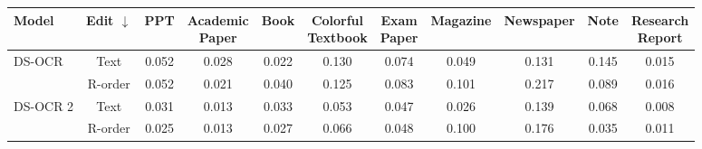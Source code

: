 \documentclass[11pt, a4paper, logo, copyright, nonumbering]{deepseek}
\begin{document}
\begin{CJK*}{UTF8}{gbsn}
\begin{table}[ht]
{        
        \begin{tabular}{l|c|ccccccccc}
                \toprule
            Model & Edit $\downarrow$ & PPT & \makecell{Academic \\ Paper} & Book & \makecell{Colorful \\ Textbook} & \makecell{Exam \\ Paper} & Magazine & Newspaper & Note & \makecell{Research \\ Report}  \\
                \midrule
                \multirow{2}{*}{DS-OCR} & Text & 0.052 & 0.028 & 0.022 & 0.130 & 0.074 & 0.049 & 0.131 & 0.145 & 0.015   \\
                  & R-order & 0.052 & 0.021 & 0.040 & 0.125 & 0.083 & 0.101 & 0.217 & 0.089 & 0.016   \\
                \midrule
                 \multirow{2}{*}{DS-OCR 2}  &Text & 0.031 & 0.013 & 0.033 & 0.053 & 0.047 & 0.026 & 0.139 & 0.068 & 0.008  \\
                         &R-order & 0.025 & 0.013 & 0.027 & 0.066 & 0.048 & 0.100 & 0.176 & 0.035 & 0.011   \\

                
    \bottomrule
    \end{tabular}}

    \label{table-3}
	
\end{table}



\begin{table}[!t]\small
    \centering

    \caption{Production performance comparison between DeepSeek-OCR and DeepSeek-OCR 2. For OCR models serving LLM pipelines, ground truth is not accessible in production environments. Therefore, Repetition rate constitutes the primary observable quality metric.}
    \setlength{\abovecaptionskip}{0.2cm}
\end{table}
\end{CJK*}
\end{document}
